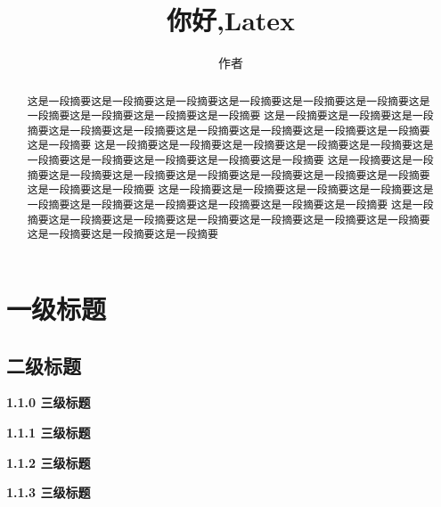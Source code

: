 \documentclass[]{article}
\title{你好,Latex}
\author{作者}
\begin{document}
		
		\maketitle
		
		\begin{abstract}
			
			这是一段摘要这是一段摘要这是一段摘要这是一段摘要这是一段摘要这是一段摘要这是一段摘要这是一段摘要这是一段摘要这是一段摘要	这是一段摘要这是一段摘要这是一段摘要这是一段摘要这是一段摘要这是一段摘要这是一段摘要这是一段摘要这是一段摘要这是一段摘要	这是一段摘要这是一段摘要这是一段摘要这是一段摘要这是一段摘要这是一段摘要这是一段摘要这是一段摘要这是一段摘要这是一段摘要	这是一段摘要这是一段摘要这是一段摘要这是一段摘要这是一段摘要这是一段摘要这是一段摘要这是一段摘要这是一段摘要这是一段摘要	这是一段摘要这是一段摘要这是一段摘要这是一段摘要这是一段摘要这是一段摘要这是一段摘要这是一段摘要这是一段摘要这是一段摘要	这是一段摘要这是一段摘要这是一段摘要这是一段摘要这是一段摘要这是一段摘要这是一段摘要这是一段摘要这是一段摘要这是一段摘要
		\end{abstract}
		 \newpage
		 \tableofcontents %
		 \newpage
		\section{一级标题}
		\subsection{二级标题}
		\noindent \textbf{1.1.0 三级标题}
		
			\noindent \textbf{1.1.1 三级标题}
			
				\noindent \textbf{1.1.2 三级标题}
				
					\noindent \textbf{1.1.3 三级标题}
\end{document}
